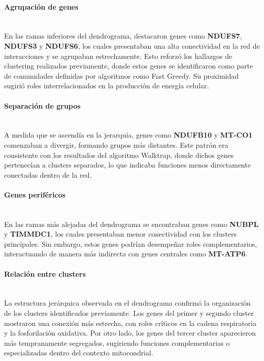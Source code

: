 \paragraph{Agrupación de genes} \mbox{}\\

En las ramas inferiores del dendrograma, destacaron genes como \textbf{NDUFS7}, \textbf{NDUFS3} y \textbf{NDUFS6}, los cuales presentaban una alta conectividad en la red de interacciones y se agrupaban estrechamente. Esto reforzó los hallazgos de clustering realizados previamente, donde estos genes se identificaron como parte de comunidades definidas por algoritmos como Fast Greedy. Su proximidad sugirió roles interrelacionados en la producción de energía celular.

\paragraph{Separación de grupos} \mbox{}\\

A medida que se ascendía en la jerarquía, genes como \textbf{NDUFB10} y \textbf{MT-CO1} comenzaban a divergir, formando grupos más distantes. Este patrón era consistente con los resultados del algoritmo Walktrap, donde dichos genes pertenecían a clusters separados, lo que indicaba funciones menos directamente conectadas dentro de la red.

\paragraph{Genes periféricos} \mbox{}\\

En las ramas más alejadas del dendrograma se encontraban genes como \textbf{NUBPL} y \textbf{TIMMDC1}, los cuales presentaban menor conectividad con los clusters principales. Sin embargo, estos genes podrían desempeñar roles complementarios, interactuando de manera más indirecta con genes centrales como \textbf{MT-ATP6}.

\paragraph{Relación entre clusters} \mbox{}\\

La estructura jerárquica observada en el dendrograma confirmó la organización de los clusters identificados previamente. Los genes del primer y segundo cluster mostraron una conexión más estrecha, con roles críticos en la cadena respiratoria y la fosforilación oxidativa. Por otro lado, los genes del tercer cluster aparecieron más tempranamente segregados, sugiriendo funciones complementarias o especializadas dentro del contexto mitocondrial.

